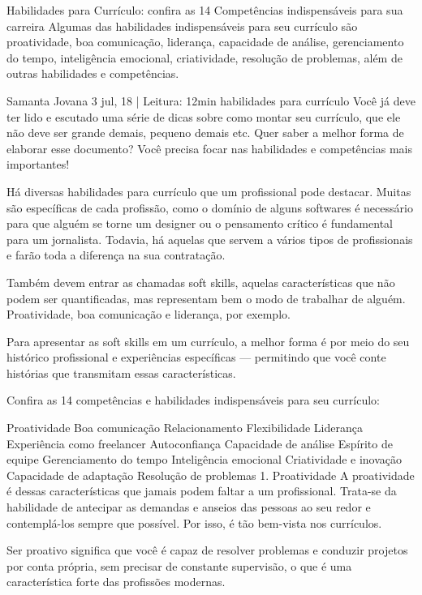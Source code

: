 \begin{commentA} \vspace{0.3cm} \noindent
Habilidades para Currículo: confira as 14 Competências indispensáveis para sua carreira
Algumas das habilidades indispensáveis para seu currículo são proatividade, boa comunicação, liderança, capacidade de análise, gerenciamento do tempo, inteligência emocional, criatividade, resolução de problemas, além de outras habilidades e competências.

Samanta Jovana
3 jul, 18 | Leitura: 12min
habilidades para currículo
Você já deve ter lido e escutado uma série de dicas sobre como montar seu currículo, que ele não deve ser grande demais, pequeno demais etc. Quer saber a melhor forma de elaborar esse documento? Você precisa focar nas habilidades e competências mais importantes!

Há diversas habilidades para currículo que um profissional pode destacar. Muitas são específicas de cada profissão, como o domínio de alguns softwares é necessário para que alguém se torne um designer ou o pensamento crítico é fundamental para um jornalista. Todavia, há aquelas que servem a vários tipos de profissionais e farão toda a diferença na sua contratação.

Também devem entrar as chamadas soft skills, aquelas características que não podem ser quantificadas, mas representam bem o modo de trabalhar de alguém. Proatividade, boa comunicação e liderança, por exemplo.

Para apresentar as soft skills em um currículo, a melhor forma é por meio do seu histórico profissional e experiências específicas — permitindo que você conte histórias que transmitam essas características.

Confira as 14 competências e habilidades indispensáveis para seu currículo:

Proatividade
Boa comunicação
Relacionamento
Flexibilidade
Liderança
Experiência como freelancer
Autoconfiança
Capacidade de análise
Espírito de equipe
Gerenciamento do tempo
Inteligência emocional
Criatividade e inovação
Capacidade de adaptação
Resolução de problemas
1. Proatividade
A proatividade é dessas características que jamais podem faltar a um profissional. Trata-se da habilidade de antecipar as demandas e anseios das pessoas ao seu redor e contemplá-los sempre que possível. Por isso, é tão bem-vista nos currículos.

Ser proativo significa que você é capaz de resolver problemas e conduzir projetos por conta própria, sem precisar de constante supervisão, o que é uma característica forte das profissões modernas.


\end{commentA}
